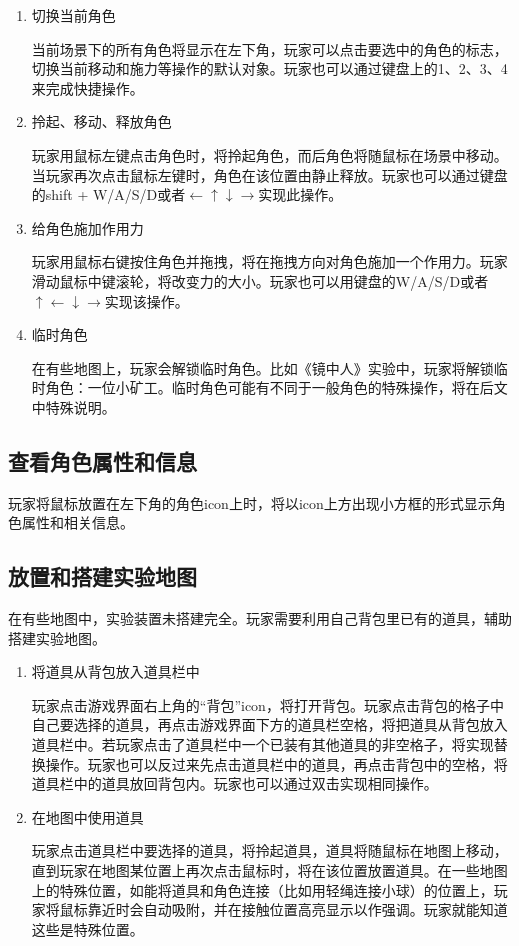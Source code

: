 \documentclass{tstextbook}
\begin{document}
\begin{enumerate}

\item{切换当前角色}

当前场景下的所有角色将显示在左下角，玩家可以点击要选中的角色的标志，切换当前移动和施力等操作的默认对象。玩家也可以通过键盘上的1、2、3、4来完成快捷操作。

\item{拎起、移动、释放角色}

玩家用鼠标左键点击角色时，将拎起角色，而后角色将随鼠标在场景中移动。当玩家再次点击鼠标左键时，角色在该位置由静止释放。玩家也可以通过键盘的shift + W/A/S/D或者$\leftarrow\uparrow\downarrow\rightarrow$实现此操作。

\item{给角色施加作用力}

玩家用鼠标右键按住角色并拖拽，将在拖拽方向对角色施加一个作用力。玩家滑动鼠标中键滚轮，将改变力的大小。玩家也可以用键盘的W/A/S/D或者$\uparrow\leftarrow\downarrow\rightarrow$实现该操作。

\item{临时角色}

在有些地图上，玩家会解锁临时角色。比如《镜中人》实验中，玩家将解锁临时角色：一位小矿工。临时角色可能有不同于一般角色的特殊操作，将在后文中特殊说明。

\end{enumerate}

\subsection{查看角色属性和信息}

玩家将鼠标放置在左下角的角色icon上时，将以icon上方出现小方框的形式显示角色属性和相关信息。

\subsection{放置和搭建实验地图}

在有些地图中，实验装置未搭建完全。玩家需要利用自己背包里已有的道具，辅助搭建实验地图。

\begin{enumerate}

\item{将道具从背包放入道具栏中}

玩家点击游戏界面右上角的“背包”icon，将打开背包。玩家点击背包的格子中自己要选择的道具，再点击游戏界面下方的道具栏空格，将把道具从背包放入道具栏中。若玩家点击了道具栏中一个已装有其他道具的非空格子，将实现替换操作。玩家也可以反过来先点击道具栏中的道具，再点击背包中的空格，将道具栏中的道具放回背包内。玩家也可以通过双击实现相同操作。

\item{在地图中使用道具}

玩家点击道具栏中要选择的道具，将拎起道具，道具将随鼠标在地图上移动，直到玩家在地图某位置上再次点击鼠标时，将在该位置放置道具。在一些地图上的特殊位置，如能将道具和角色连接（比如用轻绳连接小球）的位置上，玩家将鼠标靠近时会自动吸附，并在接触位置高亮显示以作强调。玩家就能知道这些是特殊位置。

\end{enumerate}
\end{document}
